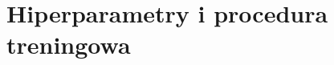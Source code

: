 \documentclass[11pt]{article}
\begin{document}





\newpage
\section{Hiperparametry i procedura treningowa}
\label{sec:train}
\end{document}
